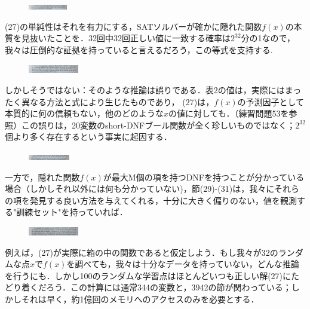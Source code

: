 \documentclass[dvipdfmx,a4paper,12pt]{jsarticle}
\begin{document}
\newpage
\begin{figure}[htbp]
  \centering
  \includegraphics[width=17mm,angle=270]{images/3-2.jpg}
\end{figure}

(27)の単純性はそれを有力にする，SATソルバーが確かに隠れた関数$f(x)$の本質を見抜いたことを．32回中32回正しい値に一致する確率は$2^{32}$分の1なので，我々は圧倒的な証拠を持っていると言えるだろう，この等式を支持する.

\begin{figure}[htbp]
  \centering
  \includegraphics[width=22mm,angle=270]{images/3-3.jpg}
\end{figure}

 しかしそうではない：そのような推論は誤りである．表2の値は，実際にはまったく異なる方法と式により生じたものであり， (27)は，$f(x)$の予測因子として本質的に何の信頼もない，他のどのような$x$の値に対しても．（練習問題53を参照）この誤りは，20変数のshort-DNFブール関数が全く珍しいものではなく；$2^{32}$個より多く存在するという事実に起因する．
 \begin{figure}[htbp]
  \centering
  \includegraphics[width=18mm,angle=270]{images/3-4.jpg}
\end{figure}

一方で，隠れた関数$f(x)$が最大M個の項を持つDNFを持つことが分かっている場合（しかしそれ以外には何も分かっていない)，節(29)-(31)は，我々にそれらの項を発見する良い方法を与えてくれる，十分に大きく偏りのない，値を観測する"訓練セット"を持っていれば．

 \begin{figure}[htbp]
  \centering
  \includegraphics[width=22mm,angle=270]{images/3-5.jpg}
\end{figure}

例えば，(27)が実際に箱の中の関数であると仮定しよう．もし我々が32のランダムな点$x$で$f(x)$を調べても，我々は十分なデータを持っていない，どんな推論を行うにも．しかし100のランダムな学習点はほとんどいつも正しい解(27)にたどり着くだろう．この計算には通常344の変数と，3942の節が関わっている；しかしそれは早く，約1億回のメモリへのアクセスのみを必要とする．
\end{document}
